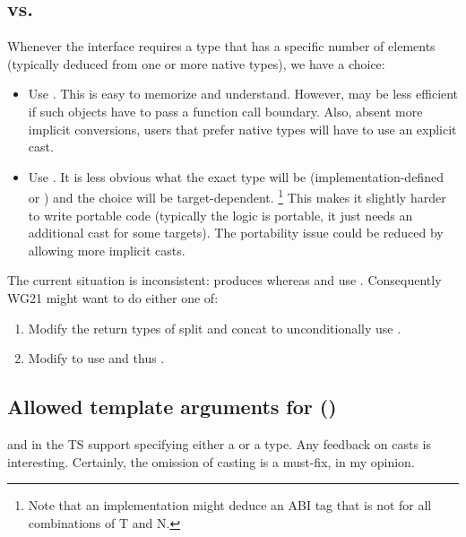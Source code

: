 \subsection{ vs. } \ghfeedback
Whenever the interface requires a \simd type that has a specific number of elements (typically deduced from one or more native types), we have a choice:
\begin{itemize}
  \item Use \fixedsizeN.
    This is easy to memorize and understand.
    However, \fixedsizeN may be less efficient if such objects have to pass a function call boundary.
    Also, absent more implicit conversions, users that prefer native types will have to use an explicit cast.
  \item Use .
    It is less obvious what the exact type will be (implementation-defined or \fixedsizeN) and the choice will be target-dependent.%
    \footnote{Note that an implementation might deduce an ABI tag that is not \fixedsizeN for all combinations of \type T and \code N.}
    This makes it slightly harder to write portable code (typically the logic is portable, it just needs an additional cast for some targets).
    The portability issue could be reduced by allowing more implicit casts.
\end{itemize}

The current situation is inconsistent:
 produces  whereas  and  use .
Consequently WG21 might want to do either one of:
\begin{enumerate}
  \item Modify the return types of split and concat to unconditionally use \fixedsizeN.
  \item Modify  to use  and thus .
\end{enumerate}

\subsection{Allowed template arguments for ()} \ghfeedback

 and  in the TS support specifying either a  or a  type.
Any feedback on casts is interesting.
Certainly, the omission of casting \maskT is a must-fix, in my opinion.

